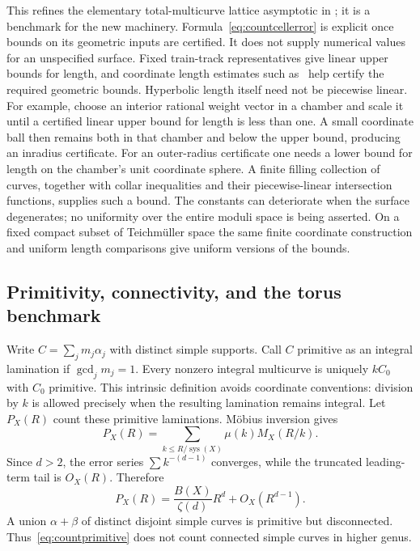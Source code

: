 \documentclass[11pt,a4paper]{article}
\numberwithin{equation}{section}
\theoremstyle{definition}
\theoremstyle{remark}
\begin{document}
This refines the elementary total-multicurve lattice asymptotic in
\cite[Proposition 3.1]{MirzSimple}; it is a benchmark for the new
machinery.  Formula~\eqref{eq:countcellerror} is explicit once bounds
on its geometric inputs are certified.  It does not supply numerical
values for an unspecified surface.  Fixed train-track representatives
give linear upper bounds for length, and coordinate length estimates
such as~\cite{LuoStongLengths} help certify the required geometric
bounds.  Hyperbolic length itself need not be piecewise linear.
For example, choose an interior rational weight vector in a chamber
and scale it until a certified linear upper bound for length is less
than one.  A small coordinate ball then remains both in that chamber
and below the upper bound, producing an inradius certificate.
For an outer-radius certificate one needs a lower bound for length
on the chamber's unit coordinate sphere.  A finite filling collection
of curves, together with collar inequalities and their
piecewise-linear intersection functions, supplies such a bound.
The constants can deteriorate when the surface degenerates; no
uniformity over the entire moduli space is being asserted.
On a fixed compact subset of Teichm\"uller space the same finite
coordinate construction and uniform length comparisons give uniform
versions of the bounds.

\subsection{Primitivity, connectivity, and the torus benchmark}
\label{subsec:countprimitive}

Write $C=\sum_jm_j\alpha_j$ with distinct simple supports.  Call $C$
primitive as an integral lamination if $\gcd_jm_j=1$.
Every nonzero integral multicurve is uniquely $kC_0$ with $C_0$
primitive.  This intrinsic definition avoids coordinate conventions:
division by $k$ is allowed precisely when the resulting lamination
remains integral.  Let $P_X(R)$ count these primitive laminations.
M\"obius inversion gives
\[
 P_X(R)=\sum_{k\leq R/\operatorname{sys}(X)}\mu(k)M_X(R/k).
\]
Since $d>2$, the error series $\sum k^{-(d-1)}$ converges, while
the truncated leading-term tail is $O_X(R)$.  Therefore
\begin{equation}
 P_X(R)=\frac{B(X)}{\zeta(d)}R^d+O_X(R^{d-1}).
 \label{eq:countprimitive}
\end{equation}
A union $\alpha+\beta$ of distinct disjoint simple curves is primitive
but disconnected.  Thus~\eqref{eq:countprimitive} does not count
connected simple curves in higher genus.
\end{document}
